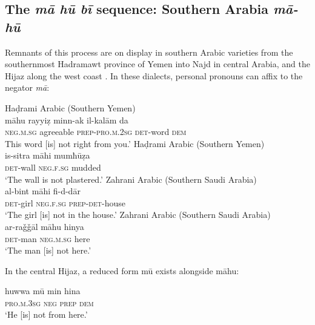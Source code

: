 \documentclass[output=paper]{langsci/langscibook}
\begin{document}
\begin{exe}\label{ex:WiAR-30}  \end{exe}

\subsection{The \textit{mā hū bī} sequence: Southern Arabia \textit{mā-hū}} \label{s:WiAR-4.3}

Remnants of this process are on display in southern Arabic varieties from the southernmost Hadramawt province of Yemen \citep[185-186]{al-saqqaf1999a} into Najd \citep[44]{ingham1994a} in central Arabia, and the Hijaz along the west coast \citep[41]{omar1975a}. In these dialects, personal pronouns can affix to the negator \textit{mā}:

\ea \label{ex:WiAR-31}
  \ea Haḍrami Arabic (Southern Yemen)\\
  	\gll māhu rayyiẓ minn-ak il-kalām da\\
  	\textsc{neg.m.sg} agreeable \textsc{prep-pro.m.2sg} \textsc{det}-word \textsc{dem}\\
  	\glt This word [is] not right from you.’ \citep[186]{al-saqqaf1999a}
  \ex Haḍrami Arabic (Southern Yemen)\\
  	\gll is-sitra māhi mumħūẓa\\
  	\textsc{det}-wall \textsc{neg.f.sg} mudded\\
	\glt ‘The wall is not plastered.’ \citep[186]{al-saqqaf1999a}
  \ex Zahrani Arabic (Southern Saudi Arabia)\\
  	\gll al-bint māhi fi-d-dār\\
  	\textsc{det}-girl \textsc{neg.f.sg} \textsc{prep-det}-house\\
	\glt ‘The girl [is] not in the house.’ \citep[305]{alzahrani2015a}
  \ex Zahrani Arabic (Southern Saudi Arabia)\\
  	\gll ar-raǧǧāl māhu hinya\\
  	\textsc{det}-man \textsc{neg.m.sg} here\\
  	\glt ‘The man [is] not here.' \citep[307]{alzahrani2015a}
\z \z

In the central Hijaz, a reduced form mū exists alongside māhu:

\ea \label{ex:WiAR-32}
	\gll huwwa mū min hina \\
	\textsc{pro.m.3sg} \textsc{neg} \textsc{prep} \textsc{dem}\\
	\glt ‘He [is] not from here.’ \citep[41]{omar1975a}
\z
\end{document}
